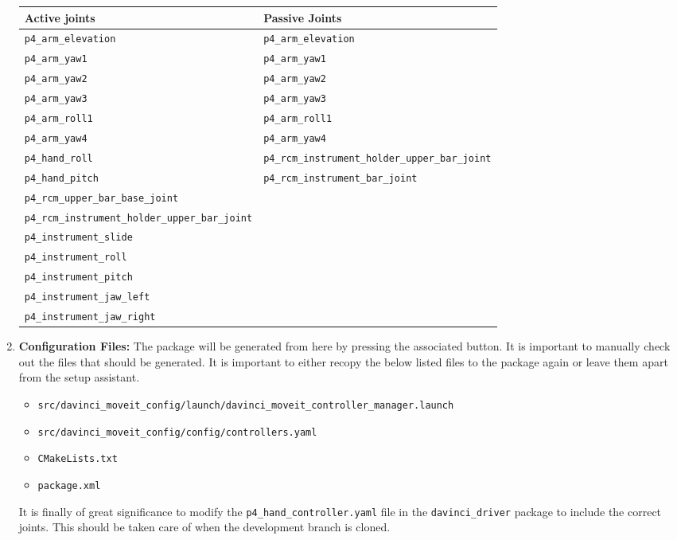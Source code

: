 \begin{enumerate}
\begin{table}[H]
\hspace{1cm}\begin{tabular}{l|l}
\textbf{Active joints} & \textbf{Passive Joints} \\
\hline
 \texttt{p4\_arm\_elevation} & \texttt{p4\_arm\_elevation} \\
  \texttt{p4\_arm\_yaw1} & \texttt{p4\_arm\_yaw1} \\
   \texttt{p4\_arm\_yaw2} & \texttt{p4\_arm\_yaw2} \\
    \texttt{p4\_arm\_yaw3} & \texttt{p4\_arm\_yaw3} \\
     \texttt{p4\_arm\_roll1} & \texttt{p4\_arm\_roll1} \\
      \texttt{p4\_arm\_yaw4} & \texttt{p4\_arm\_yaw4} \\
       \texttt{p4\_hand\_roll} & \texttt{p4\_rcm\_instrument\_holder\_upper\_bar\_joint} \\
        \texttt{p4\_hand\_pitch} & \texttt{p4\_rcm\_instrument\_bar\_joint} \\
          \texttt{p4\_rcm\_upper\_bar\_base\_joint} &  \\
   \texttt{p4\_rcm\_instrument\_holder\_upper\_bar\_joint} & \\
    \texttt{p4\_instrument\_slide} & \\
     \texttt{p4\_instrument\_roll} &  \\
      \texttt{p4\_instrument\_pitch} & \\
       \texttt{p4\_instrument\_jaw\_left} & \\
        \texttt{p4\_instrument\_jaw\_right} & \\
\end{tabular}
\end{table}
\item \textbf{Configuration Files:} The package will be generated from here by pressing the associated button. It is important to manually check out the files that should be generated. It is important to either recopy the below listed files to the package again or leave them apart from the setup assistant.
\begin{itemize}
	\item \texttt{src/davinci\_moveit\_config/launch/davinci\_moveit\_controller\_manager.launch}
	\item \texttt{src/davinci\_moveit\_config/config/controllers.yaml}
	\item \texttt{CMakeLists.txt}
	\item \texttt{package.xml}
\end{itemize}
It is finally of great significance to modify the \texttt{p4\_hand\_controller.yaml} file in the \texttt{davinci\_driver} package to include the correct joints. This should be taken care of when the development branch is cloned.
\end{enumerate}
%
%
